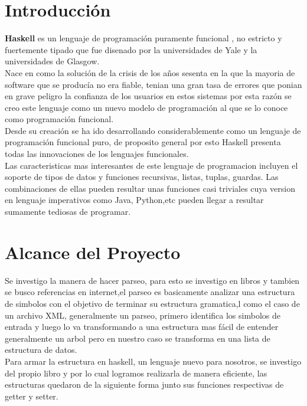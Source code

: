 \documentclass[a4paper,openright,12pt]{report}
\begin{document}
\chapter{Introducción}
\textbf{Haskell} es un lenguaje de programación puramente funcional , no estricto y fuertemente tipado que fue disenado por la universidades de Yale y la universidades de Glasgow.\\

Nace en como la solución de la crisis de los años sesenta en la que la mayoria de software que se producía no era fiable, tenian una gran tasa de errores que ponian en grave peligro la confianza de los usuarios en estos sistemas por esta razón se creo este lenguaje como un nuevo modelo de programación al que se lo conoce como programación funcional.\\

Desde su creación se ha ido desarrollando considerablemente como un lenguaje de programación funcional puro, de proposito general por esto Haskell presenta todas las innovaciones de los lenguajes funcionales.\\

 Las caracteristicas mas interesantes de este lenguaje de programacion incluyen el soporte de tipos de datos y funciones recursivas, listas, tuplas,  guardas. Las combinaciones de ellas pueden resultar unas funciones casi triviales cuya version en lenguaje imperativos como  Java, Python,etc pueden llegar a resultar sumamente tediosas de programar.\\


\chapter{Alcance del Proyecto}
Se investigo la manera de hacer parseo, para esto se investigo en libros y tambien se busco referencias en internet,el parseo es basicamente analizar una estructura de simbolos con el objetivo de terminar su estructura gramatica,l como el
caso de un archivo XML, generalmente un parseo, primero identifica los simbolos de entrada y luego lo va transformando 
a una estructura mas fácil de entender generalmente un arbol pero en nuestro caso se transforma en una lista de estructura de datos.\\

Para armar la estructura en haskell, un lenguaje nuevo para nosotros, se investigo del propio libro y por lo cual logramos
realizarla de manera eficiente, las estructuras quedaron de la siguiente forma junto sus funciones respectivas de getter y setter.\\\\\\\\
\end{document}
